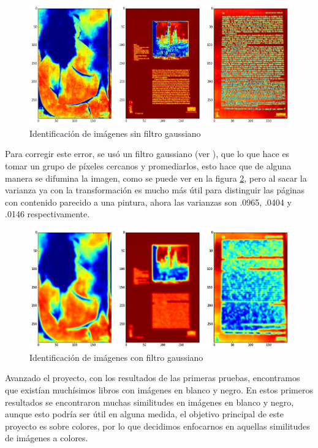 \begin{figure}[H]
\centering
\includegraphics[width=1\textwidth]{Figures/prueba_varianza_1.jpg}
\caption{Identificación de imágenes sin filtro gaussiano}
\label{fig:varianza-sin}
\end{figure}

Para corregir este error, se usó un filtro gaussiano (ver \cite{burt1981fast}), que lo que hace es tomar un grupo de píxeles cercanos y promediarlos, esto hace que de alguna manera se difumina la imagen, como se puede ver en la figura \ref{fig:varianza-con}, pero al sacar la varianza ya con la transformación es mucho más útil para distinguir las páginas con contenido parecido a una pintura, ahora las varianzas son .0965, .0404 y .0146 respectivamente.

\begin{figure}[H]
\centering
\includegraphics[width=1\textwidth]{Figures/prueba_varianza_2.jpg}
\caption{Identificación de imágenes con filtro gaussiano}
\label{fig:varianza-con}
\end{figure}

Avanzado el proyecto, con los resultados de las primeras pruebas, encontramos que existían muchísimos libros con imágenes en blanco y negro. En estos primeros resultados se encontraron muchas similitudes en imágenes en blanco y negro, aunque esto podría ser útil en alguna medida, el objetivo principal de este proyecto es sobre colores, por lo que decidimos enfocarnos en aquellas similitudes de imágenes a colores.

